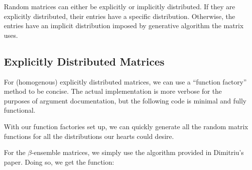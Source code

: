 Random matrices can either be explicitly or implicitly distributed. If they are explicitly distributed, their entries have a specific distribution. Otherwise, the entries have an implicit distribution imposed by generative algorithm the matrix uses.

\subsection{Explicitly Distributed Matrices}

For (homogenous) explicitly distributed matrices, we can use a ``function factory'' method to be concise. The actual implementation is more verbose for the purposes of argument documentation, but the following code is minimal and fully functional. %



With our function factories set up, we can quickly generate all the random matrix functions for all the distributions our hearts could desire.


\newpage


For the $\beta$-ensemble matrices, we simply use the algorithm provided in Dimitriu's paper. Doing so, we get the function:




\newpage
